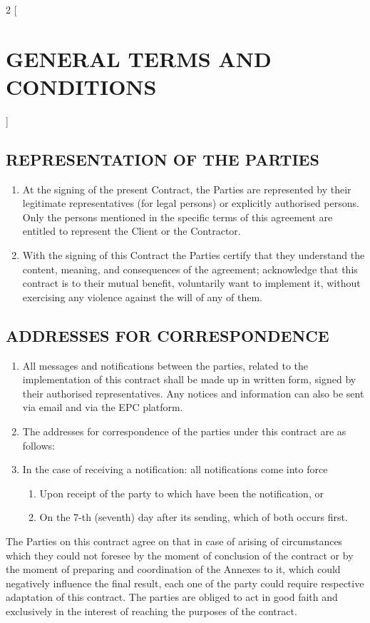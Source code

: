 \begin{multicols}{2} [\section{GENERAL TERMS AND CONDITIONS}]
      \subsection{REPRESENTATION OF THE PARTIES}
      \begin{enumerate}
      \item At the signing of the present Contract, the Parties are
        represented by their legitimate representatives (for legal
        persons) or explicitly authorised persons. Only the persons
        mentioned in the specific terms of this agreement are entitled
        to represent the Client or the Contractor.
      \item With the signing of this Contract the Parties certify that
        they understand the content, meaning, and consequences of the
        agreement; acknowledge that this contract is to their mutual
        benefit, voluntarily want to implement it, without exercising
        any violence against the will of any of them.
      \end{enumerate}

    \subsection{ADDRESSES FOR CORRESPONDENCE}
    \begin{enumerate}
    \item All messages and notifications between the parties, related
      to the implementation of this contract shall be made up in
      written form, signed by their authorised representatives. Any
      notices and information can also be sent via email and via the
      EPC platform.

    \item The addresses for correspondence of the parties under this
      contract are as follows:
    \item In the case of receiving a notification: all notifications
      come into force
      \begin{enumerate}
      \item Upon receipt of the party to which have been the
        notification, or
      \item On the 7-th (seventh) day after its sending, which of both
        occurs first.
      \end{enumerate}

    \end{enumerate}
    The Parties on this contract agree on that in case of arising of
    circumstances which they could not foresee by the moment of
    conclusion of the contract or by the moment of preparing and
    coordination of the Annexes to it, which could negatively
    influence the final result, each one of the party could require
    respective adaptation of this contract. The parties are obliged to
    act in good faith and exclusively in the interest of reaching the
    purposes of the contract.


  \end{multicols}
